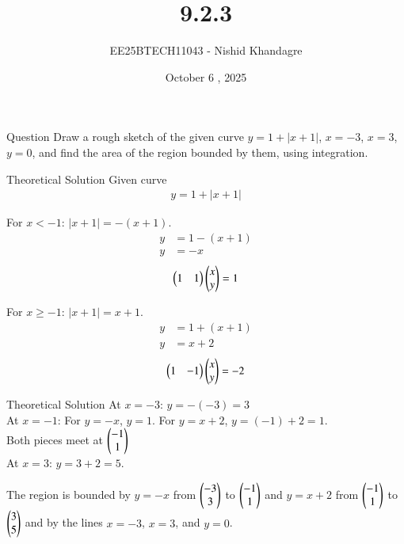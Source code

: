 \documentclass{beamer}
\title
{9.2.3}
\date{October 6 , 2025}
\author
{EE25BTECH11043 - Nishid Khandagre}
\begin{document}
\frame{\titlepage}

\begin{frame}{Question}
Draw a rough sketch of the given curve $y = 1 + |x + 1|$, $x = -3$, $x = 3$, $y = 0$, and
find the area of the region bounded by them, using integration.
\end{frame}

\begin{frame}{Theoretical Solution}
Given curve
\begin{align}
y = 1 + |x + 1|
\end{align}


For $x < -1$: $|x+1| = -(x+1)$.
    \begin{align}
        y &= 1 - (x+1) \\
        y &= -x
        \end{align}
        \begin{align}
        \begin{pmatrix}1&1\end{pmatrix}\begin{pmatrix}x\\y\end{pmatrix}=1
    \end{align}

     For $x \ge -1$: $|x+1| = x+1$.
    \begin{align}
        y &= 1 + (x+1) \\
        y &= x+2
        \end{align}
        \begin{align}
        \begin{pmatrix}1&-1\end{pmatrix}\begin{pmatrix}x\\y\end{pmatrix}=-2
    \end{align}
\end{frame}


\begin{frame}{Theoretical Solution}
At $x=-3$: $y = -(-3) = 3$\\
At $x=-1$: For $y=-x$, $y=1$. For $y=x+2$, $y=(-1)+2=1$.\\Both pieces meet at $\begin{pmatrix}-1\\1\end{pmatrix}$\\

At $x=3$: $y = 3+2 = 5$.



The region is bounded by $y = -x$ from $\begin{pmatrix}-3\\3\end{pmatrix}$ to $\begin{pmatrix}-1\\1\end{pmatrix}$ and $y = x+2$ from $\begin{pmatrix}-1\\1\end{pmatrix}$ to $\begin{pmatrix}3\\5\end{pmatrix}$ and by the lines $x=-3$, $x=3$, and $y=0$.
\end{frame}
\end{document}
